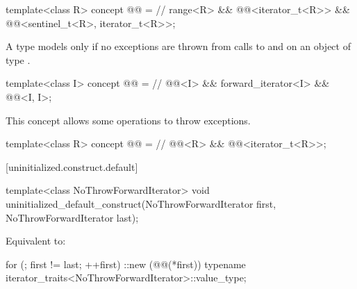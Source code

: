\begin{itemdecl}
template<class R>
concept @@ = // \expos
  range<R> &&
  @@<iterator_t<R>> &&
  @@<sentinel_t<R>, iterator_t<R>>;
\end{itemdecl}

\begin{itemdescr}
\pnum
A type  models  only if
no exceptions are thrown from calls to  and
 on an object of type .
\end{itemdescr}

\begin{itemdecl}
template<class I>
concept @@ = // \expos
  @@<I> &&
  forward_iterator<I> &&
  @@<I, I>;
\end{itemdecl}

\begin{itemdescr}
\pnum
\begin{note}
This concept allows some 
operations to throw exceptions.
\end{note}
\end{itemdescr}

\begin{itemdecl}
template<class R>
concept @@ = // \expos
  @@<R> &&
  @@<iterator_t<R>>;
\end{itemdecl}

[uninitialized.construct.default]{}

%
\begin{itemdecl}
template<class NoThrowForwardIterator>
  void uninitialized_default_construct(NoThrowForwardIterator first, NoThrowForwardIterator last);
\end{itemdecl}

\begin{itemdescr}
\pnum
\effects
Equivalent to:
\begin{codeblock}
for (; first != last; ++first)
  ::new (@@(*first))
    typename iterator_traits<NoThrowForwardIterator>::value_type;
\end{codeblock}
\end{itemdescr}

